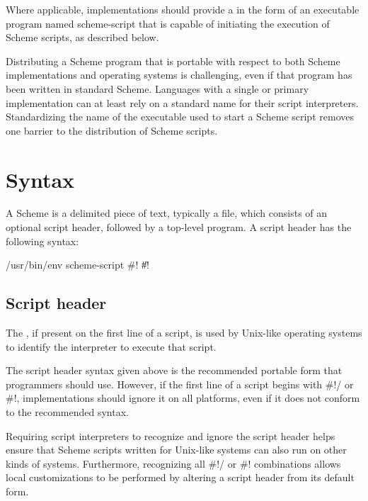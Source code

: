 \documentclass[twoside,twocolumn]{algol60}
\begin{document}
Where applicable, implementations should provide a  in 
the form of an executable program named {\cf scheme-script} that is 
capable of initiating the execution of Scheme scripts, as described 
below.

\begin{rationale}
Distributing a Scheme program that is portable with respect to both 
Scheme implementations and operating systems is challenging, even 
if that program has been written in standard Scheme.  Languages with 
a single or primary implementation can at least rely on a standard 
name for their script interpreters.  Standardizing the name of the 
executable used to start a Scheme script removes one barrier to the 
distribution of Scheme scripts.
\end{rationale}

\section{Syntax}
\label{scriptsyntaxsection}

A Scheme  is a delimited piece of text, typically a
file, which consists of an optional script header, followed by a
top-level program.  A script header has the following syntax:
%
\begin{grammar}
 \:  /usr/bin/env  
  \> scheme-script 
 \: \#! \| \#! 
\end{grammar}

\subsection{Script header}

The , if present on the first line of a script,
is used by Unix-like operating systems to identify the interpreter to 
execute that script.

The script header syntax given above is the recommended portable 
form that programmers should use.  However, if the first line 
of a script begins with {\cf \#!/} or {\cf \#!}, 
implementations should ignore it on all platforms, even if it does not conform to 
the recommended syntax.  

\begin{rationale}
Requiring script interpreters to recognize and ignore the script 
header helps ensure that Scheme scripts written for Unix-like systems 
can also run on other kinds of systems. Furthermore, recognizing
all {\cf \#!/} or {\cf \#!} combinations 
allows local customizations to be 
performed by altering a script header from its default form.
\end{rationale}
\end{document}
